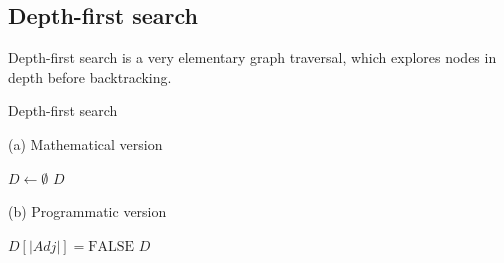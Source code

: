 \subsection{Depth-first search} \label{algorithm-reachability-dfs}
Depth-first search is a very elementary graph traversal, which explores nodes in depth before backtracking.
\begin{algorithm}[h]
    \caption{Depth-first search}
    \label{alg-dfs}
    \begin{minipage}[t]{0.49\linewidth}
        (a) Mathematical version
        \begin{algorithmic}[1]
            \State $D \gets \emptyset$
                 \Return {$ $}
                \EndIf 
                \EndFor
                \State \Return $D$
            \EndFunction
        \end{algorithmic}
    \end{minipage}
    \begin{minipage}[t]{0.49\linewidth}
        (b) Programmatic version
        \begin{algorithmic}[1]
            \State $D[|Adj|] = \text{FALSE}$
                 \Return {$ $}
                \EndIf 
                \EndFor
                \State \Return $D$
            \EndFunction
        \end{algorithmic}
    \end{minipage}
\end{algorithm}
